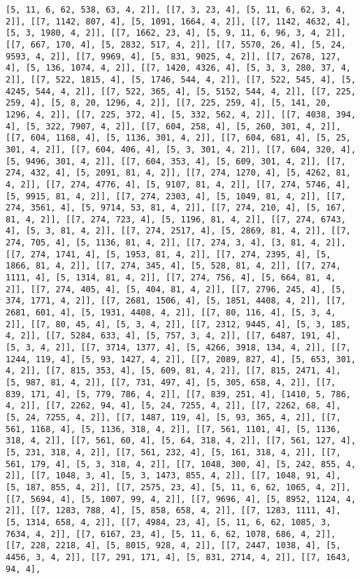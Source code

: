 \documentclass[12pt,fleqn]{article}\usepackage{../../common}
\begin{document}
\begin{verbatim}
[5, 11, 6, 62, 538, 63, 4, 2]], [[7, 3, 23, 4], [5, 11, 6, 62, 3, 4, 2]], [[7, 1142, 807, 4], [5, 1091, 1664, 4, 2]], [[7, 1142, 4632, 4], [5, 3, 1980, 4, 2]], [[7, 1662, 23, 4], [5, 9, 11, 6, 96, 3, 4, 2]], [[7, 667, 170, 4], [5, 2832, 517, 4, 2]], [[7, 5570, 26, 4], [5, 24, 9593, 4, 2]], [[7, 9969, 4], [5, 831, 9025, 4, 2]], [[7, 2678, 127, 4], [5, 136, 1074, 4, 2]], [[7, 1420, 4326, 4], [5, 3, 3, 280, 37, 4, 2]], [[7, 522, 1815, 4], [5, 1746, 544, 4, 2]], [[7, 522, 545, 4], [5, 4245, 544, 4, 2]], [[7, 522, 365, 4], [5, 5152, 544, 4, 2]], [[7, 225, 259, 4], [5, 8, 20, 1296, 4, 2]], [[7, 225, 259, 4], [5, 141, 20, 1296, 4, 2]], [[7, 225, 372, 4], [5, 332, 562, 4, 2]], [[7, 4038, 394, 4], [5, 322, 7907, 4, 2]], [[7, 604, 258, 4], [5, 260, 301, 4, 2]], [[7, 604, 1168, 4], [5, 1136, 301, 4, 2]], [[7, 604, 681, 4], [5, 25, 301, 4, 2]], [[7, 604, 406, 4], [5, 3, 301, 4, 2]], [[7, 604, 320, 4], [5, 9496, 301, 4, 2]], [[7, 604, 353, 4], [5, 609, 301, 4, 2]], [[7, 274, 432, 4], [5, 2091, 81, 4, 2]], [[7, 274, 1270, 4], [5, 4262, 81, 4, 2]], [[7, 274, 4776, 4], [5, 9107, 81, 4, 2]], [[7, 274, 5746, 4], [5, 9915, 81, 4, 2]], [[7, 274, 2303, 4], [5, 1049, 81, 4, 2]], [[7, 274, 3561, 4], [5, 9714, 53, 81, 4, 2]], [[7, 274, 210, 4], [5, 167, 81, 4, 2]], [[7, 274, 723, 4], [5, 1196, 81, 4, 2]], [[7, 274, 6743, 4], [5, 3, 81, 4, 2]], [[7, 274, 2517, 4], [5, 2869, 81, 4, 2]], [[7, 274, 705, 4], [5, 1136, 81, 4, 2]], [[7, 274, 3, 4], [3, 81, 4, 2]], [[7, 274, 1741, 4], [5, 1953, 81, 4, 2]], [[7, 274, 2395, 4], [5, 1866, 81, 4, 2]], [[7, 274, 345, 4], [5, 528, 81, 4, 2]], [[7, 274, 1111, 4], [5, 1314, 81, 4, 2]], [[7, 274, 756, 4], [5, 664, 81, 4, 2]], [[7, 274, 405, 4], [5, 404, 81, 4, 2]], [[7, 2796, 245, 4], [5, 374, 1771, 4, 2]], [[7, 2681, 1506, 4], [5, 1851, 4408, 4, 2]], [[7, 2681, 601, 4], [5, 1931, 4408, 4, 2]], [[7, 80, 116, 4], [5, 3, 4, 2]], [[7, 80, 45, 4], [5, 3, 4, 2]], [[7, 2312, 9445, 4], [5, 3, 185, 4, 2]], [[7, 5284, 633, 4], [5, 757, 3, 4, 2]], [[7, 6487, 191, 4], [5, 3, 4, 2]], [[7, 3714, 1377, 4], [5, 4266, 3918, 134, 4, 2]], [[7, 1244, 119, 4], [5, 93, 1427, 4, 2]], [[7, 2089, 827, 4], [5, 653, 301, 4, 2]], [[7, 815, 353, 4], [5, 609, 81, 4, 2]], [[7, 815, 2471, 4], [5, 987, 81, 4, 2]], [[7, 731, 497, 4], [5, 305, 658, 4, 2]], [[7, 839, 171, 4], [5, 779, 786, 4, 2]], [[7, 839, 251, 4], [1410, 5, 786, 4, 2]], [[7, 2262, 94, 4], [5, 24, 7255, 4, 2]], [[7, 2262, 68, 4], [5, 24, 7255, 4, 2]], [[7, 1487, 119, 4], [5, 93, 365, 4, 2]], [[7, 561, 1168, 4], [5, 1136, 318, 4, 2]], [[7, 561, 1101, 4], [5, 1136, 318, 4, 2]], [[7, 561, 60, 4], [5, 64, 318, 4, 2]], [[7, 561, 127, 4], [5, 231, 318, 4, 2]], [[7, 561, 232, 4], [5, 161, 318, 4, 2]], [[7, 561, 179, 4], [5, 3, 318, 4, 2]], [[7, 1048, 300, 4], [5, 242, 855, 4, 2]], [[7, 1048, 3, 4], [5, 3, 1473, 855, 4, 2]], [[7, 1048, 91, 4], [5, 187, 855, 4, 2]], [[7, 2575, 23, 4], [5, 11, 6, 62, 1065, 4, 2]], [[7, 5694, 4], [5, 1007, 99, 4, 2]], [[7, 9696, 4], [5, 8952, 1124, 4, 2]], [[7, 1283, 788, 4], [5, 858, 658, 4, 2]], [[7, 1283, 1111, 4], [5, 1314, 658, 4, 2]], [[7, 4984, 23, 4], [5, 11, 6, 62, 1085, 3, 7634, 4, 2]], [[7, 6167, 23, 4], [5, 11, 6, 62, 1078, 686, 4, 2]], [[7, 228, 2218, 4], [5, 8015, 928, 4, 2]], [[7, 2447, 1038, 4], [5, 4456, 3, 4, 2]], [[7, 291, 171, 4], [5, 831, 2714, 4, 2]], [[7, 1643, 94, 4], 
\end{verbatim}
\end{document}
